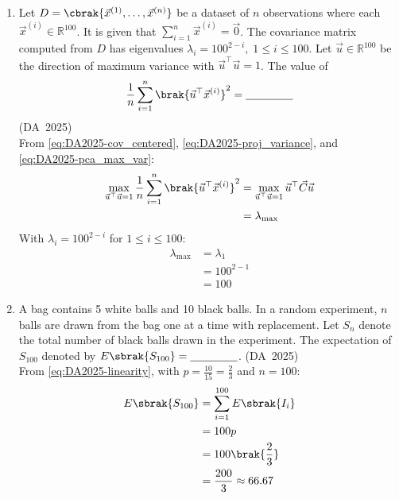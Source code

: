 \begin{enumerate}[label=\thesubsection.\arabic*, ref=\thesubsection.\theenumi]
	\item 
	Let $D = \cbrak{\vec{x}^{(1)}, \dots, \vec{x}^{(n)}}$ be a dataset of $n$ observations where each $\vec{x}^{(i)} \in \mathbb{R}^{100}$. It is given that $\sum_{i=1}^n \vec{x}^{(i)} = \vec{0}$. The covariance matrix computed from $D$ has eigenvalues $\lambda_i = 100^{2-i}, \; 1 \le i \le 100$. Let $\vec{u} \in \mathbb{R}^{100}$ be the direction of maximum variance with $\vec{u}^{\top}\vec{u} = 1$. The value of
	\begin{align}
		\frac{1}{n}\sum_{i=1}^n \brak{\vec{u}^{\top}\vec{x}^{(i)}}^2 = \underline{\hspace{1.5cm}}
	\end{align}
	\hfill (DA~2025)
	\\
	\solution
	From \eqref{eq:DA2025-cov_centered}, \eqref{eq:DA2025-proj_variance}, and \eqref{eq:DA2025-pca_max_var}:
	\begin{align}
		\max_{\vec{u}^\top\vec{u} = 1} \frac{1}{n}\sum_{i=1}^n \brak{\vec{u}^\top \vec{x}^{(i)}}^2 &= \max_{\vec{u}^\top\vec{u} = 1} \vec{u}^\top \vec{C} \vec{u}
		\\
		&= \lambda_{\max}
	\end{align}
	With $\lambda_i = 100^{2-i}$ for $1 \le i \le 100$:
	\begin{align}
		\lambda_{\max} &= \lambda_1
		\\
		&= 100^{2-1}
		\\
		&= 100
	\end{align}
	
	\item 
	A bag contains 5 white balls and 10 black balls. In a random experiment, $n$ balls are drawn from the bag one at a time with replacement. Let $S_n$ denote the total number of black balls drawn in the experiment.
	The expectation of $S_{100}$ denoted by $E\sbrak{S_{100}} = \underline{\hspace{1.5cm}}$.
	\hfill (DA~2025)
	\\
	\solution
	From \eqref{eq:DA2025-linearity}, with $p = \frac{10}{15} = \frac{2}{3}$ and $n = 100$:
	\begin{align}
		E\sbrak{S_{100}} &= \sum_{i=1}^{100} E\sbrak{I_i}
		\\
		&= 100p
		\\
		&= 100 \brak{\frac{2}{3}}
		\\
		&= \frac{200}{3} \approx 66.67
	\end{align}
	

\end{enumerate}

